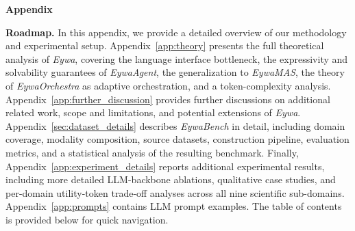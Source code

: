 \documentclass{llmxive}
\begin{document}
{%







\appendix


{{\textbf{\LARGE Appendix}}}

\textbf{Roadmap.} 
In this appendix, we provide a detailed overview of our methodology and experimental setup. 
Appendix~\ref{app:theory} presents the full theoretical analysis of \textit{Eywa}, covering the language interface bottleneck, the expressivity and solvability guarantees of \textit{EywaAgent}, the generalization to \textit{EywaMAS}, the theory of \textit{EywaOrchestra} as adaptive orchestration, and a token-complexity analysis.
Appendix~\ref{app:further_discussion} provides further discussions on additional related work, scope and limitations, and potential extensions of \textit{Eywa}.
Appendix~\ref{sec:dataset_details} describes \textit{EywaBench} in detail, including domain coverage, modality composition, source datasets, construction pipeline, evaluation metrics, and a statistical analysis of the resulting benchmark.
Finally, Appendix~\ref{app:experiment_details} reports additional experimental results, including more detailed LLM-backbone ablations, qualitative case studies, and per-domain utility-token trade-off analyses across all nine scientific sub-domains. Appendix~\ref{app:prompts} contains LLM prompt examples.
The table of contents is provided below for quick navigation.

}
\end{document}
